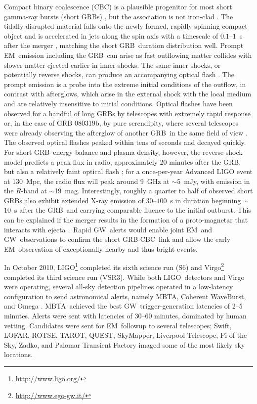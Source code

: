 \documentclass[preprint2]{aastex}
\newcommand{\mbta}{MBTA}
\newcommand{\GW}{GW}%
\newcommand{\EM}{EM}%
\newcommand{\GRB}{GRB}%
\newcommand{\CBC}{CBC}%
\newcommand{\LIGO}{LIGO}%
\begin{document}
Compact binary coalescence (\CBC) is a plausible progenitor for most short
gamma-ray bursts (short \GRB{}s) \citep{Lee:2005, nakar07}, but the
association is not iron-clad \citep{2011ApJ...727..109V}. The tidally
disrupted material falls onto the newly formed, rapidly spinning compact object
and is accelerated in jets along the spin axis with a timescale of $0.1$--$1$~s
after the merger \citep{Janka1999}, matching the short \GRB\ duration
distribution well. Prompt \EM\ emission including the \GRB\ can arise as fast
outflowing matter collides with slower matter ejected earlier in inner shocks.
The same inner shocks, or potentially reverse shocks, can produce an
accompanying optical flash \citep{Sari99}. The prompt emission is a probe into
the extreme initial conditions of the outflow, in contrast with afterglows,
which arise in the external shock with the local medium and are relatively
insensitive to initial conditions. Optical flashes have been observed for a
handful of long \GRB{}s \citep{2011CRPhy..12..255A} by telescopes with extremely
rapid response or, in the case of GRB 080319b, by pure serendipity, where
several telescopes were already observing the afterglow of another \GRB\ in
the same field of view \citep{2008Natur.455..183R}. The observed optical flashes
peaked within tens of seconds and decayed quickly. For short \GRB\ energy
balance and plasma density, however, the reverse shock model predicts a peak
flux in radio, approximately 20 minutes after the \GRB, but also a relatively
faint optical flash \citep{nakar07}; for a once-per-year Advanced LIGO event at
$130$~Mpc, the radio flux will peak around 9~GHz at $\sim$$5$~mJy, with emission
in the $R$-band at $\sim$19~mag. Interestingly, roughly a quarter to half of
observed short \GRB{}s also exhibit extended X-ray emission of $30$--$100$~s in
duration beginning $\sim$$10$~s after the \GRB\ and carrying comparable fluence
to the initial outburst. This can be explained if the merger results in the
formation of a proto-magnetar that interacts with
ejecta~\citep{Bucciantini2011}. Rapid \GW\ alerts would enable joint \EM\ and
\GW\ observations to confirm the short \GRB-\CBC\ link and allow the early
\EM\ observation of exceptionally nearby and thus bright events.

In October 2010, \LIGO{}\footnote{\url{http://www.ligo.org/}} completed its
sixth science run (S6) and Virgo\footnote{\url{http://www.ego-gw.it/}}
completed its third science run (VSR3).  While both \LIGO\ detectors and Virgo
were operating, several all-sky detection pipelines operated in a low-latency
configuration to send astronomical alerts, namely \mbta, Coherent
WaveBurst, and Omega \citep{HugheyGWPAW2011, S6lowlatency2, S6lowlatency3, S6lowlatency4}.
\mbta\ achieved the best \GW\ trigger-generation latencies of 2--5 minutes.
Alerts were sent with latencies of 30--60 minutes, dominated by human vetting.
Candidates were sent for \EM\ followup to several telescopes; Swift,
LOFAR, ROTSE, TAROT, QUEST, SkyMapper,
Liverpool Telescope, Pi of the Sky, Zadko, and Palomar Transient Factory
\citep{kanner2008, HugheyGWPAW2011} imaged some of the most likely sky
locations.
\end{document}
